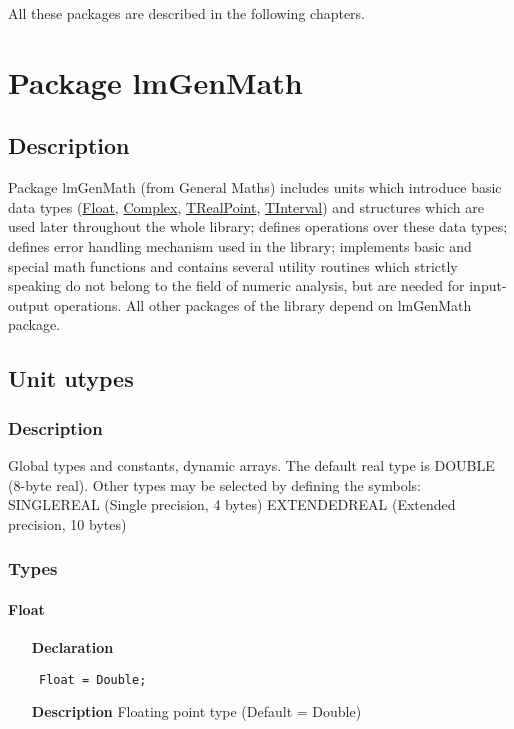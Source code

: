 \documentclass[12pt,a4paper,oneside]{report}
\newcommand{\declarationitem}[1]{\textbf{#1}}
\newcommand{\descriptiontitle}[1]{\textbf{#1}}
\newcommand{\code}[1]{\texttt{#1}}
\begin{document}
All these packages are described in the following chapters. 
\pagestyle{fancy}
\fancyhead{}
\fancyhead[RO]{\rightmark}
\fancyhead[LO]{\leftmark}
\chapter{Package lmGenMath}\label{package-lmGenMath}
\section{Description}
Package lmGenMath (from General Maths) includes units which introduce basic data types (\hyperref[utypes-Float]{Float}, \hyperref[utypes-complex]{Complex}, \hyperref[types:trealpoint]{TRealPoint}, \hyperref[uIntervals.TInterval]{TInterval}) and structures which are used later throughout the whole library; defines operations over these data types; defines error handling mechanism used in the library; implements basic and special math functions and contains several utility routines which strictly speaking do not belong to the field of numeric analysis, but are needed for input-output operations. All other packages of the library depend on lmGenMath package.  


\section{Unit utypes}
\label{utypes}
\subsection{Description}
Global types and constants, dynamic arrays. The default real type is DOUBLE (8{-}byte real). Other types may be selected by defining the symbols:
SINGLEREAL (Single precision, 4 bytes) EXTENDEDREAL (Extended precision, 10 bytes) \subsection{Types}
\subsubsection{Float}
\label{utypes-Float}
\begin{itemize}\item[\declarationitem{Declaration}\hfill]
	\begin{flushleft}
		\code{
			Float = Double;}
		
	\end{flushleft}
	
	\par
	\item[\descriptiontitle{Description}]
	Floating point type (Default = Double)
\end{itemize}
\end{document}
